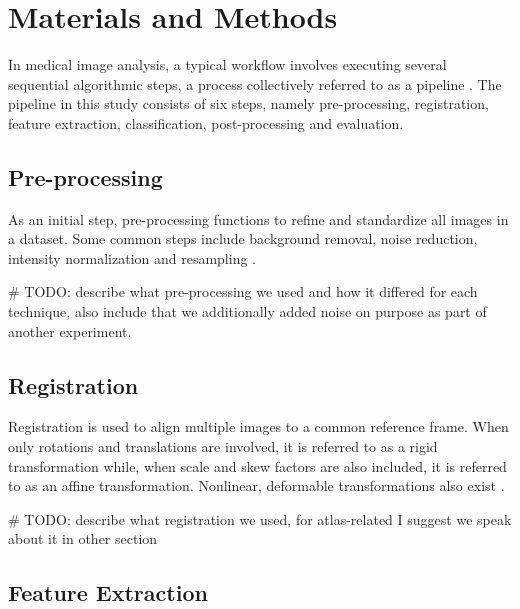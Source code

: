 \section{Materials and Methods}

In medical image analysis, a typical workflow involves executing several sequential algorithmic steps, a process collectively referred to as a pipeline \cite{b8}. The pipeline in this study consists of six steps, namely pre-processing, registration, feature extraction, classification, post-processing and evaluation.

\subsection{Pre-processing}

As an initial step, pre-processing functions to refine and standardize all images in a dataset. Some common steps include background removal, noise reduction, intensity normalization and resampling \cite{b9}.

\# TODO: describe what pre-processing we used and how it differed for each technique, also include that we additionally added noise on purpose as part of another experiment.

\subsection{Registration}

Registration is used to align multiple images to a common reference frame. When only rotations and translations are involved, it is referred to as a rigid transformation while, when scale and skew factors are also included, it is referred to as an affine transformation. Nonlinear, deformable transformations also exist \cite{b10}.

\# TODO: describe what registration we used, for atlas-related I suggest we speak about it in other section

\subsection{Feature Extraction}

